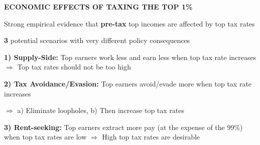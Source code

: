 \documentclass[landscape]{slides}
\begin{document}
\begin{slide}
\begin{center}
{\bf ECONOMIC EFFECTS OF TAXING THE TOP 1\%}
\end{center}
Strong empirical evidence that \textbf{pre-tax} top incomes are affected by top tax rates

\textbf{3} potential scenarios with very different policy consequences

{\bf 1) Supply-Side:} Top earners work less and earn less when top tax rate increases
$\Rightarrow$ Top tax rates should not be too high

{\bf 2) Tax Avoidance/Evasion:} Top earners avoid/evade more when top tax rate increases

$\Rightarrow$ a) Eliminate loopholes, b) Then increase top tax rates

{\bf 3) Rent-seeking:} Top earners extract more pay (at the expense of the 99\%)
when top tax rates are low 
$\Rightarrow$ High top tax rates are desirable

\end{slide}


%
%
%
%
%
\end{document}
